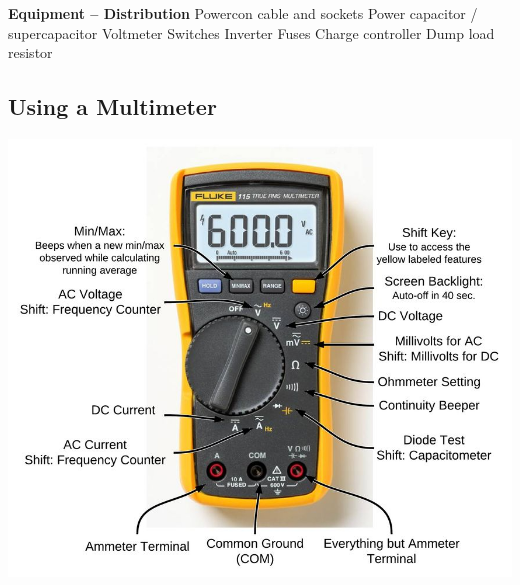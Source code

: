 \documentclass{article}
\theoremstyle{definition}
\theoremstyle{definition}
\theoremstyle{remark}
\begin{document}
    \textbf{Equipment – Distribution} \newline
    Powercon cable and sockets \newline
    Power capacitor / supercapacitor \newline
    Voltmeter \newline
    Switches \newline
    Inverter \newline
    Fuses \newline
    Charge controller \newline
    Dump load resistor
  

  {\color{blue}\subsection{Using a Multimeter}} %
  \label{sub:using_a_multimeter}

    \begin{center}
      \includegraphics[width=0.45\paperwidth]{Images/image_a_1_(multimeter).png}
    \end{center}
  

\end{document}
